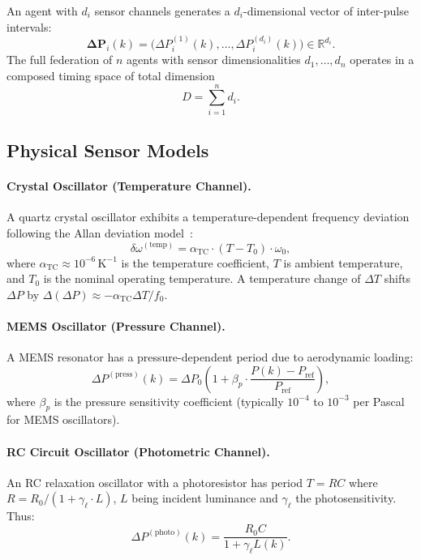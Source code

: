 \documentclass[twocolumn,10pt]{article}
\newcommand{\DeltaP}{\Delta P}
\begin{document}
An agent with $d_i$ sensor channels generates a $d_i$-dimensional vector of
inter-pulse intervals:
\[
  \boldsymbol{\DeltaP}_i(k) =
  \bigl(\DeltaP_i^{(1)}(k), \ldots, \DeltaP_i^{(d_i)}(k)\bigr) \in
  \mathbb{R}^{d_i}.
\]
The full federation of $n$ agents with sensor dimensionalities $d_1, \ldots,
d_n$ operates in a composed timing space of total dimension
\begin{equation}
\label{eq:D}
  D = \sum_{i=1}^{n} d_i.
\end{equation}

\subsection{Physical Sensor Models}

\paragraph{Crystal Oscillator (Temperature Channel).}
A quartz crystal oscillator exhibits a temperature-dependent frequency
deviation following the Allan deviation model~\cite{IEEE1588-2019}:
\[
  \delta\omega^{(\mathrm{temp})} = \alpha_{\mathrm{TC}} \cdot (T - T_0)
  \cdot \omega_0,
\]
where $\alpha_{\mathrm{TC}} \approx 10^{-6}\,\mathrm{K}^{-1}$ is the
temperature coefficient, $T$ is ambient temperature, and $T_0$ is the nominal
operating temperature. A temperature change of $\Delta T$ shifts $\DeltaP$
by $\Delta(\DeltaP) \approx -\alpha_{\mathrm{TC}} \Delta T / f_0$.

\paragraph{MEMS Oscillator (Pressure Channel).}
A MEMS resonator has a pressure-dependent period due to aerodynamic loading:
\[
  \DeltaP^{(\mathrm{press})}(k) = \DeltaP_0 \left(1 + \beta_p \cdot
  \frac{P(k) - P_{\mathrm{ref}}}{P_{\mathrm{ref}}}\right),
\]
where $\beta_p$ is the pressure sensitivity coefficient (typically $10^{-4}$
to $10^{-3}$ per Pascal for MEMS oscillators).

\paragraph{RC Circuit Oscillator (Photometric Channel).}
An RC relaxation oscillator with a photoresistor has period $T = RC$ where
$R = R_0/(1 + \gamma_\ell \cdot L)$, $L$ being incident luminance and
$\gamma_\ell$ the photosensitivity. Thus:
\[
  \DeltaP^{(\mathrm{photo})}(k) = \frac{R_0 C}{1 + \gamma_\ell L(k)}.
\]
\end{document}
